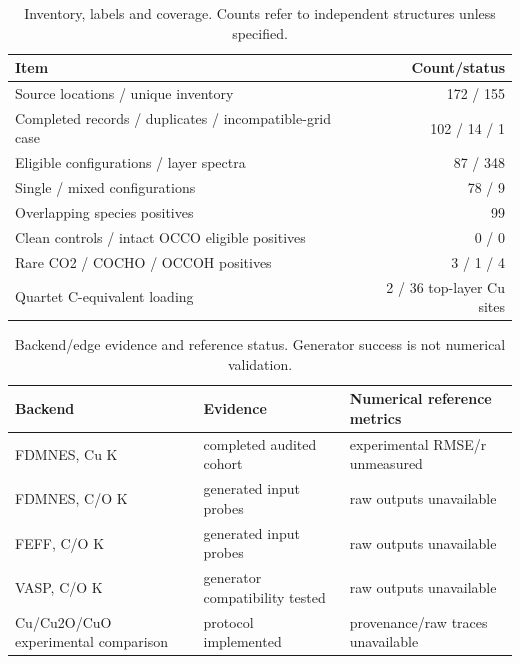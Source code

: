 \documentclass[11pt]{article}
\begin{document}
\begin{table}[ht]\centering\small
\caption{Inventory, labels and coverage. Counts refer to independent structures unless specified.}\label{tab:inventory}
\begin{tabular}{lr}\toprule Item & Count/status\\\midrule
Source locations / unique inventory & 172 / 155\\
Completed records / duplicates / incompatible-grid case & 102 / 14 / 1\\
Eligible configurations / layer spectra & 87 / 348\\
Single / mixed configurations & 78 / 9\\
Overlapping species positives & 99\\
Clean controls / intact OCCO eligible positives & 0 / 0\\
Rare CO2 / COCHO / OCCOH positives & 3 / 1 / 4\\
Quartet C-equivalent loading & 2 / 36 top-layer Cu sites\\\bottomrule
\end{tabular}\end{table}
\begin{table}[ht]\centering\small
\caption{Backend/edge evidence and reference status. Generator success is not numerical validation.}\label{tab:backend}
\begin{tabular}{lll}\toprule Backend & Evidence & Numerical reference metrics\\\midrule
FDMNES, Cu K & completed audited cohort & experimental RMSE/r unmeasured\\
FDMNES, C/O K & generated input probes & raw outputs unavailable\\
FEFF, C/O K & generated input probes & raw outputs unavailable\\
VASP, C/O K & generator compatibility tested & raw outputs unavailable\\
Cu/Cu2O/CuO experimental comparison & protocol implemented & provenance/raw traces unavailable\\\bottomrule
\end{tabular}\end{table}
\end{document}
